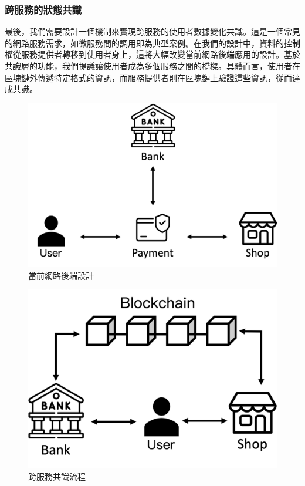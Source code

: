 \subsubsection{跨服務的狀態共識}
最後，我們需要設計一個機制來實現跨服務的使用者數據變化共識。這是一個常見的網路服務需求，如微服務間的調用即為典型案例。在我們的設計中，資料的控制權從服務提供者轉移到使用者身上，這將大幅改變當前網路後端應用的設計。基於共識層的功能，我們提議讓使用者成為多個服務之間的橋樑。具體而言，使用者在區塊鏈外傳遞特定格式的資訊，而服務提供者則在區塊鏈上驗證這些資訊，從而達成共識。
\begin{figure}
  \centering
  \includegraphics[width=\linewidth,keepaspectratio]{figures/flow-3-part-0.png}
  \caption{當前網路後端設計}
  \label{fig:flow-3-part-0}
\end{figure}
\begin{figure}
  \centering
  \includegraphics[width=\linewidth,keepaspectratio]{figures/flow-3-part.png}
  \caption{跨服務共識流程}
  \label{fig:flow-3-part}
\end{figure}
